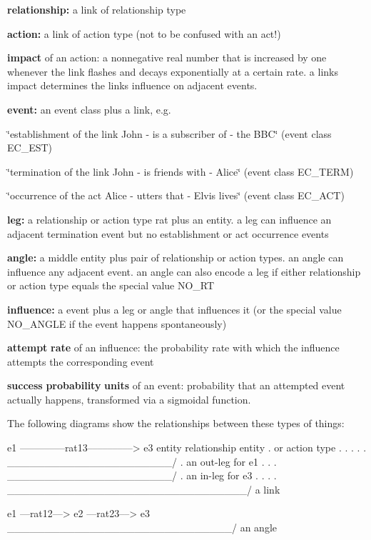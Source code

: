 \begin{DoxyItemize}
\item {\bfseries relationship\+:} a link of relationship type
\item {\bfseries action\+:} a link of action type (not to be confused with an act!)
\item {\bfseries impact} of an action\+: a nonnegative real number that is increased by one whenever the link flashes and decays exponentially at a certain rate. a link\textquotesingle{}s impact determines the link\textquotesingle{}s influence on adjacent events.
\item {\bfseries event\+:} an event class plus a link, e.\+g.
\begin{DoxyItemize}
\item \char`\"{}establishment of the link \textquotesingle{}\+John -\/ is a subscriber of -\/ the B\+B\+C\textquotesingle{}\char`\"{} (event class E\+C\+\_\+\+E\+ST)
\item \char`\"{}termination of the link \textquotesingle{}\+John -\/ is friends with -\/ Alice\textquotesingle{}\char`\"{} (event class E\+C\+\_\+\+T\+E\+RM)
\item \char`\"{}occurrence of the act \textquotesingle{}\+Alice -\/ utters that -\/ Elvis lives\textquotesingle{}\char`\"{} (event class E\+C\+\_\+\+A\+CT)
\end{DoxyItemize}
\item {\bfseries leg\+:} a relationship or action type rat plus an entity. a leg can influence an adjacent termination event but no establishment or act occurrence events
\item {\bfseries angle\+:} a middle entity plus pair of relationship or action types. an angle can influence any adjacent event. an angle can also encode a leg if either relationship or action type equals the special value N\+O\+\_\+\+RT
\item {\bfseries influence\+:} a event plus a leg or angle that influences it (or the special value N\+O\+\_\+\+A\+N\+G\+LE if the event happens spontaneously)
\item {\bfseries attempt} {\bfseries rate} of an influence\+: the probability rate with which the influence attempts the corresponding event
\item {\bfseries success} {\bfseries probability} {\bfseries units} of an event\+: probability that an attempted event actually happens, transformed via a sigmoidal function.
\end{DoxyItemize}

The following diagrams show the relationships between these types of things\+: \begin{DoxyVerb}  e1 –––––––––rat13–––––––––> e3
entity     relationship     entity
  .       or action type       .
  .             .              .
  .       \______________________/
  .           an out-leg for e1
  .             .              .
\______________________/       .
    an in-leg for e3           .
  .             .              .
\________________________________/
              a link


  e1 ––rat12––> e2 ––rat23––> e3
 \______________________________/
             an angle
\end{DoxyVerb}


